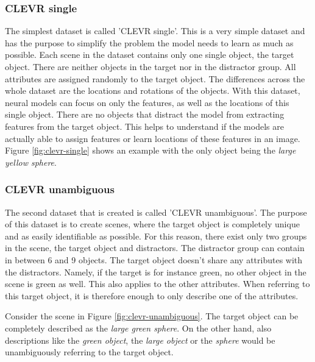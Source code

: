 \subsubsection{CLEVR single}
The simplest dataset is called 'CLEVR single'.
This is a very simple dataset and has the purpose to simplify the problem the model needs to learn as much as possible.
Each scene in the dataset contains only one single object, the target object.
There are neither objects in the target nor in the distractor group.
All attributes are assigned randomly to the target object.
The differences across the whole dataset are the locations and rotations of the objects.
With this dataset, neural models can focus on only the features, as well as the locations of this single object.
There are no objects that distract the model from extracting features from the target object.
This helps to understand if the models are actually able to assign features or learn locations of these features in an image.
Figure \ref{fig:clevr-single} shows an example with the only object being the \emph{large yellow sphere}.

\subsubsection{CLEVR unambiguous}
The second dataset that is created is called 'CLEVR unambiguous'.
The purpose of this dataset is to create scenes, where the target object is completely unique and as easily identifiable as possible.
For this reason, there exist only two groups in the scene, the target object and distractors.
The distractor group can contain in between 6 and 9 objects.
The target object doesn't share any attributes with the distractors.
Namely, if the target is for instance green, no other object in the scene is green as well.
This also applies to the other attributes.
When referring to this target object, it is therefore enough to only describe one of the attributes.

Consider the scene in Figure \ref{fig:clevr-unambiguous}.
The target object can be completely described as the \emph{large green sphere}.
On the other hand, also descriptions like the \emph{green object}, the \emph{large object} or the \emph{sphere} would be unambiguously referring to the target object.

